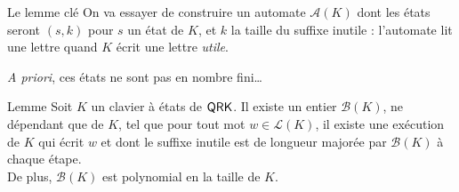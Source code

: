 \documentclass[11pt,french,professionalfonts]{beamer}
\renewcommand{\L}{\mathcal{L}}
\newcommand{\A}{\mathcal{A}}
\begin{document}
\begin{frame}{Le lemme clé}
	On va essayer de construire un automate $\A(K)$ dont les états seront $(s,k)$ pour $s$ un état de $K$, et $k$ la taille du suffixe inutile : l'automate lit une lettre quand $K$ écrit une lettre \emph{utile}.
	\pause

	\emph{A priori}, ces états ne sont pas en nombre fini\dots 
	\pause
	\begin{alertblock}{Lemme}
		Soit $K$ un clavier à états de $\mathsf{QRK}$. Il existe un entier $\mathcal{B}(K)$, ne dépendant que de $K$, tel que pour tout mot $w \in \L(K)$,
        il existe une exécution de $K$ qui écrit $w$ et dont le suffixe inutile est de longueur majorée par $\mathcal{B}(K)$ à chaque étape. \\
        De plus, $\mathcal{B}(K)$ est polynomial en la taille de $K$.
	\end{alertblock}
\end{frame}
\end{document}
